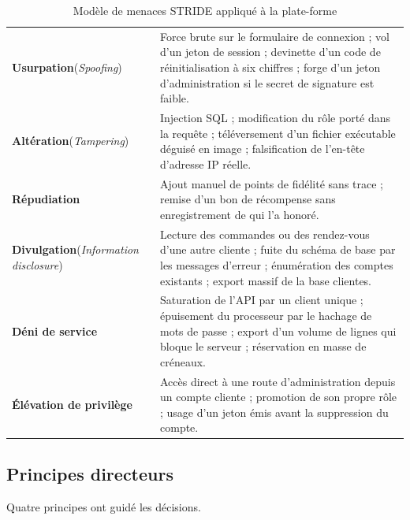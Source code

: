 \begin{table}[H]
\centering
\caption{Modèle de menaces STRIDE appliqué à la plate-forme}
\label{tab:stride}
\begin{tabularx}{\textwidth}{L{2.9cm} X}
\toprule
{} &  \\
\midrule
\textbf{Usurpation}\newline\small(\textit{Spoofing}) &
Force brute sur le formulaire de connexion ; vol d'un jeton de session ;
devinette d'un code de réinitialisation à six chiffres ; forge d'un jeton
d'administration si le secret de signature est faible. \\

\textbf{Altération}\newline\small(\textit{Tampering}) &
Injection SQL ; modification du rôle porté dans la requête ; téléversement
d'un fichier exécutable déguisé en image ; falsification de l'en-tête
d'adresse IP réelle. \\

\textbf{Répudiation} &
Ajout manuel de points de fidélité sans trace ; remise d'un bon de récompense
sans enregistrement de qui l'a honoré. \\

\textbf{Divulgation}\newline\small(\textit{Information disclosure}) &
Lecture des commandes ou des rendez-vous d'une autre cliente ; fuite du schéma
de base par les messages d'erreur ; énumération des comptes existants ; export
massif de la base clientes. \\

\textbf{Déni de service} &
Saturation de l'API par un client unique ; épuisement du processeur par le
hachage de mots de passe ; export d'un volume de lignes qui bloque le
serveur ; réservation en masse de créneaux. \\

\textbf{Élévation de privilège} &
Accès direct à une route d'administration depuis un compte cliente ;
promotion de son propre rôle ; usage d'un jeton émis avant la suppression du
compte. \\
\bottomrule
\end{tabularx}
\end{table}

\subsection{Principes directeurs}

Quatre principes ont guidé les décisions.

